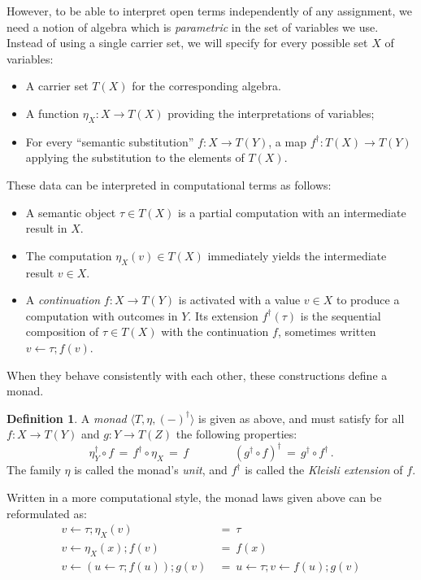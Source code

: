 \documentclass[11pt,oneside]{book}
\theoremstyle{definition}
\newtheorem{definition}[theorem]{Definition}
\begin{document}
However,
to be able to interpret open terms
independently of any assignment,
we need a notion of algebra which is \emph{parametric}
in the set of variables we use.
Instead of using a single carrier set,
we will specify for every possible
set $X$ of variables:
\begin{itemize}
  \item A carrier set $T(X)$ for the corresponding algebra.
  \item A function $\eta_X : X \rightarrow T(X)$
    providing the interpretations of variables;
  \item For every ``semantic substitution''
    $f : X \rightarrow T(Y)$,
    a map $f^\dagger : T(X) \rightarrow T(Y)$
    applying the substitution to the elements of $T(X)$.
\end{itemize}
These data can be interpreted in computational terms as follows:
\begin{itemize}
  \item
    A semantic object $\tau \in T(X)$
    is a partial computation
    with an intermediate result in $X$.
  \item
    The computation $\eta_X(v) \in T(X)$
    immediately yields the intermediate result $v \in X$.
  \item
    A \emph{continuation} $f : X \rightarrow T(Y)$
    is activated with a value $v \in X$
    to produce a computation with outcomes in $Y$.
    Its extension $f^\dagger(\tau)$
    is the sequential composition
    of $\tau \in T(X)$
    with the continuation $f$,
    sometimes written
    $v \mathbin{\leftarrow} \tau \mathbin{;} f(v)$.
\end{itemize}
When they behave consistently with each other,
these constructions define a monad.

\begin{definition} \label{def:setmonad}
A \emph{monad} $\langle T, \eta, (-)^\dagger \rangle$
is given as above,
and must satisfy
for all $f : X \rightarrow T(Y)$ and
$g : Y \rightarrow T(Z)$
the following properties:
\[
  \eta_Y^\dagger \circ f \, = \,
  f^\dagger \circ \eta_X \, = \,
  f
  \qquad \qquad
  (g^\dagger \circ f)^\dagger \, = \,
  g^\dagger \circ f^\dagger
  \,.
\]
The family $\eta$
is called the monad's \emph{unit},
and $f^\dagger$
is called the \emph{Kleisli extension} of $f$.
\end{definition}

Written in a more computational style,
the monad laws given above
can be reformulated as:
\begin{align*}
  v \mathbin\leftarrow \tau \mathbin; \eta_X(v) \:&=\: \tau
  \\
  v \mathbin\leftarrow \eta_X(x) \mathbin; f(v) \:&=\: f(x)
  \\
  v \mathbin\leftarrow
    (u \mathbin\leftarrow \tau \mathbin; f(u))
      \mathbin; g(v) \:&=\:
  u \mathbin\leftarrow \tau \mathbin;
    v \mathbin\leftarrow f(u) \mathbin;
      g(v)
\end{align*}
\end{document}
